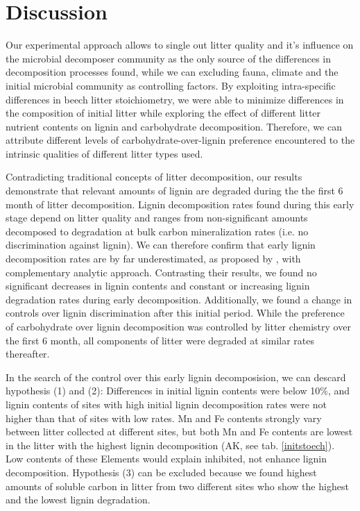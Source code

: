\documentclass[10pt]{article}
\begin{document}
\section*{Discussion}

Our experimental approach allows to single out litter quality and it's influence on the microbial decomposer community as the only source of the differences in decomposition processes found, while we can excluding fauna, climate and the initial microbial community as controlling factors. By exploiting intra-specific differences in beech litter stoichiometry, we were able to minimize differences in the composition of initial litter while exploring the effect of different litter nutrient contents on lignin and carbohydrate decomposition. Therefore, we can attribute different levels of carbohydrate-over-lignin preference encountered to the intrinsic qualities of different litter types used.

Contradicting traditional concepts of litter decomposition, our results demonstrate that relevant amounts of lignin are degraded during the the first 6 month of litter decomposition. Lignin decomposition rates found during this early stage depend on litter quality and ranges from non-significant amounts decomposed to degradation at bulk carbon mineralization rates (i.e. no discrimination against lignin). We can therefore confirm that early lignin decomposition rates are by far underestimated, as proposed by \cite{Klotzbucher2011}, with complementary analytic approach. Contrasting their results, we found no significant decreases in lignin contents and constant or increasing lignin degradation rates during early decomposition. Additionally, we found a change in controls over lignin discrimination after this initial period. While the preference of carbohydrate over lignin decomposition was controlled by litter chemistry over the first 6 month, all components of litter were degraded at similar rates thereafter.

In the search of the control over this early lignin decomposision, we can descard hypothesis (1) and (2): Differences in initial lignin contents were below 10\%, and lignin contents of sites with high initial lignin decomposition rates were not higher than that of sites with low rates. Mn and Fe contents strongly vary between litter collected at different sites, but both Mn and Fe contents are lowest in the litter with the highest lignin decomposition (AK, see tab. \ref{initstoech}). Low contents of these Elements would explain inhibited, not enhance lignin decomposition. Hypothesis (3) can be excluded because we found highest amounts of soluble carbon in litter from two different sites who show the highest and the lowest lignin degradation.
\end{document}
